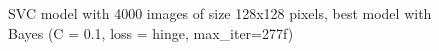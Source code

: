 \documentclass{article}
\begin{document}
\begin{figure}[!ht]
  \centering
  \qquad
  \caption{SVC model with 4000 images of size 128x128 pixels, best model with Bayes (C = 0.1,  loss = hinge, max\_iter=277f)}
  \label{fig:SVC_4000_128x128_bayes}
\end{figure}
\end{document}
